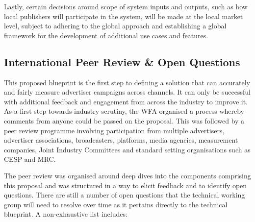 \documentclass[]{article}
\begin{document}
Lastly, certain decisions around scope of system inputs and outputs, such as how local publishers will participate in the system, will be made at the local market level, subject to adhering to the global approach and establishing a global framework for the development of additional use cases and features.

\subsection{International Peer Review \& Open Questions}

This proposed blueprint is the first step to defining a solution that can accurately and fairly measure advertiser campaigns across channels. It can only be successful with additional feedback and engagement from across the industry to improve it. As a first step towards industry scrutiny, the WFA organised a process whereby comments from anyone could be passed on the proposal. This was followed by a peer review programme involving participation from multiple advertisers, advertiser
associations, broadcasters, platforms, media agencies, measurement companies, Joint Industry Committees and standard setting organisations such as CESP and MRC.

The peer review was organised around deep dives into the components comprising this proposal and was structured in a way to elicit feedback and to identify open questions. There are still a number of open questions that the technical working group will need to resolve over time as it pertains directly to the technical blueprint. A non-exhaustive list includes:
\end{document}
